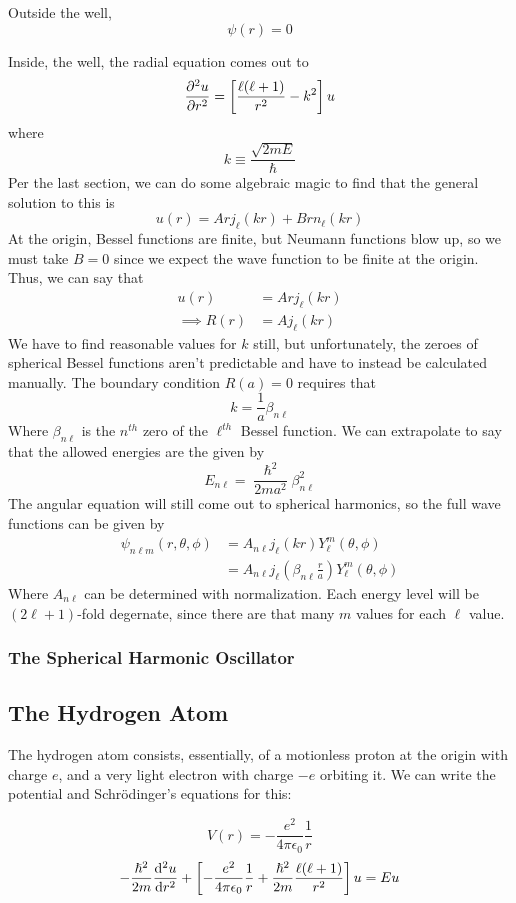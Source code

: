 \documentclass[a4paper]{article}
\begin{document}
Outside the well,
\[ \psi(r) = 0\]

Inside, the well, the radial equation comes out to
\[ \frac{\partial ^2u}{\partial r^2}=\left[\frac{\ell(\ell+1)}{r^2}-k^2\right]u \]
where
\[ k\equiv\frac{\sqrt{2mE}}{\hslash} \]
Per the last section, we can do some algebraic magic to find that the general
solution to this is
\[ u(r) = Arj_{\ell}(kr)+Brn_{\ell}(kr) \]
At the origin, Bessel functions are finite, but Neumann functions blow up,
so we must take $B=0$ since we expect the wave function to be finite at the
origin. Thus, we can say that
\begin{align*}
	u(r) &= Arj_{\ell}(kr)\\
	\implies R(r)&=Aj_{\ell}(kr)
\end{align*}
We have to find reasonable values for $k$ still, but unfortunately, the zeroes
of spherical Bessel functions aren't predictable and have to instead be
calculated manually. The boundary condition $R(a)=0$ requires that
\[ k = \frac{1}{a}\beta_{n\ell} \]
Where $\beta_{n\ell}$ is the $n^{th}$ zero of the $\ell^{th}$ Bessel function.
We can extrapolate to say that the allowed energies are the given by
\[ E_{n\ell}=\frac{\hslash^2}{2ma^2}\beta^2_{n\ell} \]
The angular equation will still come out to spherical harmonics, so the full
wave functions can be given by
\begin{align*}
\psi_{n\ell m}(r,\theta,\phi) &= A_{n\ell}j_{\ell}(kr)Y_\ell^m(\theta,\phi)\\
			      &= A_{n\ell}j_{\ell}
		\left(\beta_{n\ell}\frac{r}{a}\right)Y_\ell^m(\theta,\phi)
\end{align*}
Where $A_{n\ell}$ can be determined with normalization. Each energy level will
be $(2\ell+1)$-fold degernate, since there are that many $m$ values for each
$\ell$ value.

\subsubsection{The Spherical Harmonic Oscillator}

\subsection{The Hydrogen Atom}
The hydrogen atom consists, essentially, of a motionless proton at the origin
with charge $e$, and a very light electron with charge $-e$ orbiting it.
We can write the potential and Schr\"odinger's equations for this:

\[
	V(r) = -\frac{e^2}{4\pi\epsilon_0}\frac{1}{r}
\]
\[
	-\frac{\hslash^2}{2m}\frac{\mathrm{d} ^2u}{\mathrm{d} r^2}+\left[-\frac{e^2}{4\pi\epsilon_0}
	\frac{1}{r}+\frac{\hslash^2}{2m}\frac{\ell(\ell+1)}{r^2}\right]u
	= Eu
\]
\end{document}
